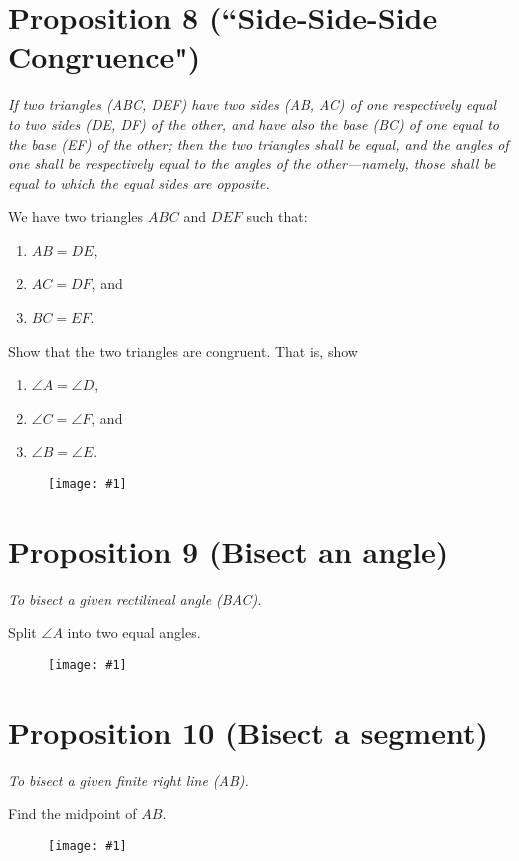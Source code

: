 \documentclass[openany]{book}
\newcommand{\diagram}[1]{
    \vspace*{\fill}
    \begin{figure}[H]
        \centering
        \texttt{[image: \#1]}
    \end{figure}
    \vspace*{\fill}
}
\newenvironment{proposition}
    {\begin{center}\em}
    {\end{center}}
\begin{document}
    \section{Proposition 8 (``Side-Side-Side Congruence")}
    \begin{proposition}
    If two triangles (ABC, DEF) have two sides (AB, AC) of one respectively equal to two sides (DE, DF) of the other,
    and have also the base (BC) of one equal to the base (EF) of the other; then the two triangles shall be equal, and
    the angles of one shall be respectively equal to the angles of the other—namely, those shall be equal to which the
    equal sides are opposite.
    \end{proposition}
    We have two triangles $ABC$ and $DEF$ such that:
    \begin{enumerate}
        \item $AB = DE$,
        \item $AC = DF$, and
        \item $BC = EF$.
    \end{enumerate}
    Show that the two triangles are congruent. That is, show
    \begin{enumerate}
        \item $\angle{A} = \angle{D}$,
        \item $\angle{C} = \angle{F}$, and
        \item $\angle{B} = \angle{E}$.
    \end{enumerate}
    \diagram{prop8.pdf}


    \clearpage
    \section{Proposition 9 (Bisect an angle)}
    \begin{proposition}
    To bisect a given rectilineal angle (BAC).
    \end{proposition}
    Split $\angle{A}$ into two equal angles.
    \diagram{prop9.pdf}


    \clearpage
    \section{Proposition 10 (Bisect a segment)}
    \begin{proposition}
    To bisect a given finite right line (AB).
    \end{proposition}
    Find the midpoint of $AB$.
    \diagram{prop10.pdf}


    \clearpage
\end{document}
